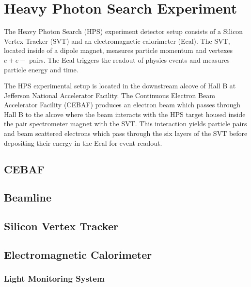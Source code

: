 \documentclass[12pt]{report}
\begin{document}
\chapter{Heavy Photon Search Experiment}
The Heavy Photon Search (HPS) experiment detector setup consists of a Silicon Vertex Tracker (SVT) and an electromagnetic calorimeter (Ecal). The SVT, located inside of a dipole magnet, measures particle momentum and vertexes $e+e-$ pairs. The Ecal triggers the readout of physics events and measures particle energy and time. \par
The HPS experimental setup is located in the downstream alcove of Hall B at Jefferson National Accelerator Facility. The Continuous Electron Beam Accelerator Facility (CEBAF) produces an electron beam which passes through Hall B to the alcove where the beam interacts with the HPS target housed inside the pair spectrometer magnet with the SVT. This interaction yields particle pairs and beam scattered electrons which pass through the six layers of the SVT before depositing their energy in the Ecal for event readout.

\section{CEBAF}



\section{Beamline}



\section{Silicon Vertex Tracker}



\section{Electromagnetic Calorimeter}



\subsection{Light Monitoring System}


\end{document}
